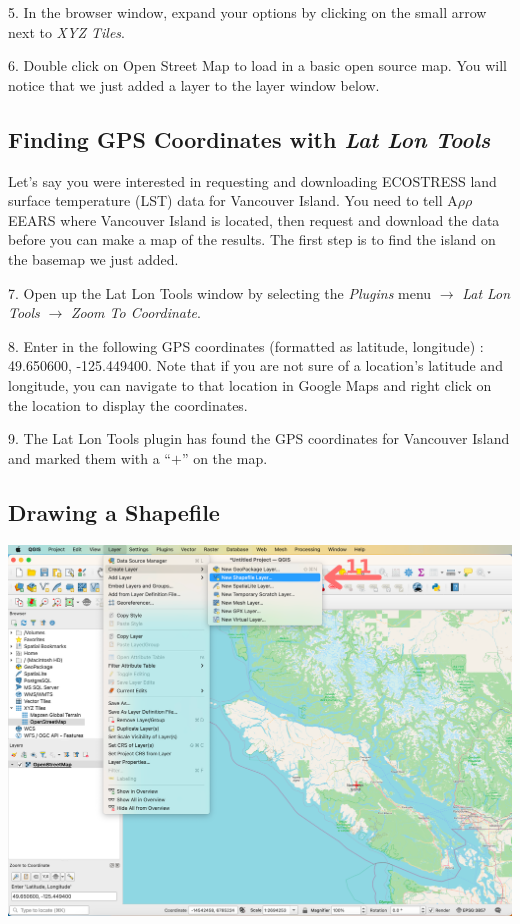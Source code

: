 \documentclass[oneside,a4paper,11pt,explicit]{book}
\begin{document}
	5. In the browser window, expand your options by clicking on the small arrow next to \textit{XYZ Tiles}.
	
	6. Double click on Open Street Map to load in a basic open source map. You will notice that we just added a layer to the layer window below.
	
	\subsection{Finding GPS Coordinates with \textit{Lat Lon Tools}}
	
	Let's say you were interested in requesting and downloading ECOSTRESS land surface temperature (LST) data for Vancouver Island. You need to tell A$\rho\rho$EEARS where Vancouver Island is located, then request and download the data before you can make a map of the results. The first step is to find the island on the basemap we just added.
	
	7. Open up the Lat Lon Tools window by selecting the \textit{Plugins} menu $\rightarrow$ \textit{Lat Lon Tools} $\rightarrow$ \textit{Zoom To Coordinate}.
	
	8. Enter in the following GPS coordinates (formatted as latitude, longitude) : 49.650600, -125.449400. Note that if you are not sure of a location's latitude and longitude, you can navigate to that location in Google Maps and right click on the location to display the coordinates. 
	
	9. The Lat Lon Tools plugin has found the GPS coordinates for Vancouver Island and marked them with a ``$+$'' on the map. 
	
	\subsection{Drawing a Shapefile}
	
	\centerline{\includegraphics[width=.9\textwidth]{CreateLayer.png}}
	
\end{document}
